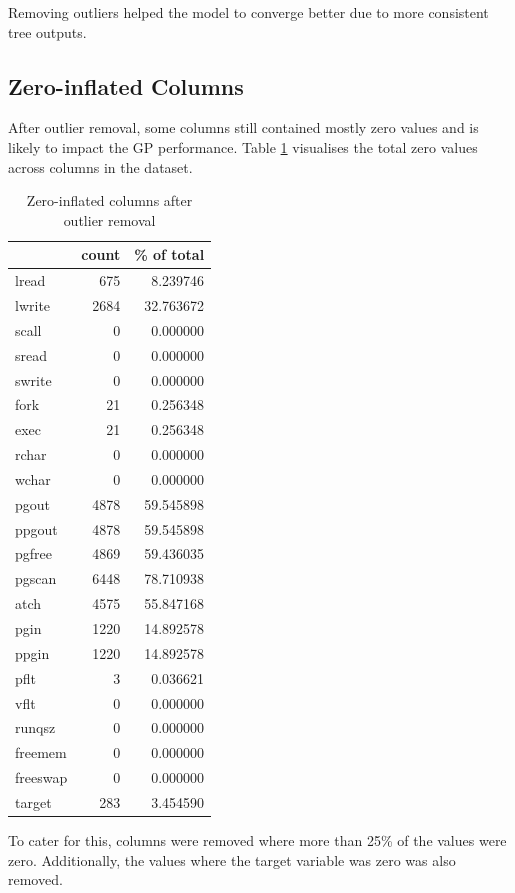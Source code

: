 \documentclass{article}
\begin{document}
Removing outliers helped the model to converge better due to more consistent tree outputs.

\subsection{Zero-inflated Columns}
After outlier removal, some columns still contained mostly zero values and is likely to impact the GP performance. Table \ref{zeroCols} visualises the total zero values across columns in the dataset.

\begin{table}[H]
  \centering
  \caption{Zero-inflated columns after outlier removal}
  \label{zeroCols}
  \begin{tabular}{lrr}
    \toprule
     & count & \% of total \\
    \midrule
    lread & 675 & 8.239746 \\
    lwrite & 2684 & 32.763672 \\
    scall & 0 & 0.000000 \\
    sread & 0 & 0.000000 \\
    swrite & 0 & 0.000000 \\
    fork & 21 & 0.256348 \\
    exec & 21 & 0.256348 \\
    rchar & 0 & 0.000000 \\
    wchar & 0 & 0.000000 \\
    pgout & 4878 & 59.545898 \\
    ppgout & 4878 & 59.545898 \\
    pgfree & 4869 & 59.436035 \\
    pgscan & 6448 & 78.710938 \\
    atch & 4575 & 55.847168 \\
    pgin & 1220 & 14.892578 \\
    ppgin & 1220 & 14.892578 \\
    pflt & 3 & 0.036621 \\
    vflt & 0 & 0.000000 \\
    runqsz & 0 & 0.000000 \\
    freemem & 0 & 0.000000 \\
    freeswap & 0 & 0.000000 \\
    target & 283 & 3.454590 \\
    \bottomrule
  \end{tabular}
\end{table}

To cater for this, columns were removed where more than 25\% of the values were zero. Additionally, the values where the target variable was zero was also removed.
\end{document}
